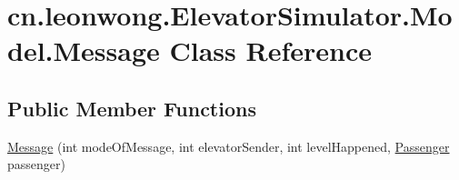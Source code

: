 \hypertarget{classcn_1_1leonwong_1_1_elevator_simulator_1_1_model_1_1_message}{}\section{cn.\+leonwong.\+Elevator\+Simulator.\+Model.\+Message Class Reference}
\label{classcn_1_1leonwong_1_1_elevator_simulator_1_1_model_1_1_message}
\subsection*{Public Member Functions}
\begin{DoxyCompactItemize}
\item 
\hyperlink{classcn_1_1leonwong_1_1_elevator_simulator_1_1_model_1_1_message_a26a9ea8cfcb1d61107a800a5e221ab6c}{Message} (int mode\+Of\+Message, int elevator\+Sender, int level\+Happened, \hyperlink{classcn_1_1leonwong_1_1_elevator_simulator_1_1_model_1_1_passenger}{Passenger} passenger)
\end{DoxyCompactItemize}
